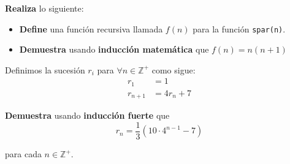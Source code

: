 \documentclass[oneside]{style}
\begin{document}
\begin{questions}[label=\protect\circled{\bfseries\arabic*}]
{        \textbf{Realiza} lo siguiente:
        \begin{itemize}
            \item \textbf{Define} una función recursiva llamada 
            $f(n)$ para la función \texttt{spar(n)}.

            \item \textbf{Demuestra} usando \textbf{inducción 
            matemática} que $f(n) = n(n+1)$
        \end{itemize}
    }

    \question
    {
        Definimos la sucesión $r_i$ para $\forall n \in \mathbb{Z}^+$ como 
        sigue: 
        \begin{align*}
            r_1 &= 1 \\ 
            r_{n+1} &= 4r_n + 7
        \end{align*}

        \textbf{Demuestra} usando \textbf{inducción fuerte} que 
        \begin{equation*}
            r_n = \frac{1}{3}(10 \cdot 4^{n-1}-7)
        \end{equation*}

        para cada $n \in \mathbb{Z}^+$. 
    }
\end{questions}
\end{document}
